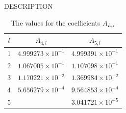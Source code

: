 \begin{qsection}{DESCRIPTION}
\begin{figure}[h]
\end{figure}

\setcounter{table}{0}
\begin{table}
        \caption{The values for the coefficients $A_{L,l}$}
        \label{tbl:lmadflt_coef}
        \setlength{\arrayrulewidth}{0.5pt}
        \renewcommand{\arraystretch}{1.2}
        \begin{center}
        \begin{tabular}{|c|c|c|} \hline
        $l$     & $A_{4,l}$			& $A_{5,l}$ \\ \hline
        1       & $4.999273\times 10^{-1}$	& $4.999391\times 10^{-1}$\\
        2       & $1.067005\times 10^{-1}$      & $1.107098\times 10^{-1}$\\
        3       & $1.170221\times 10^{-2}$      & $1.369984\times 10^{-2}$\\
        4       & $5.656279\times 10^{-4}$      & $9.564853\times 10^{-4}$\\
        5       &                               & $3.041721\times 10^{-5}$\\
      \hline
        \end{tabular}
        \end{center}
\label{tbl:lmadflt_pade}
\end{table}

\end{qsection}


\begin{options}
\end{options}

